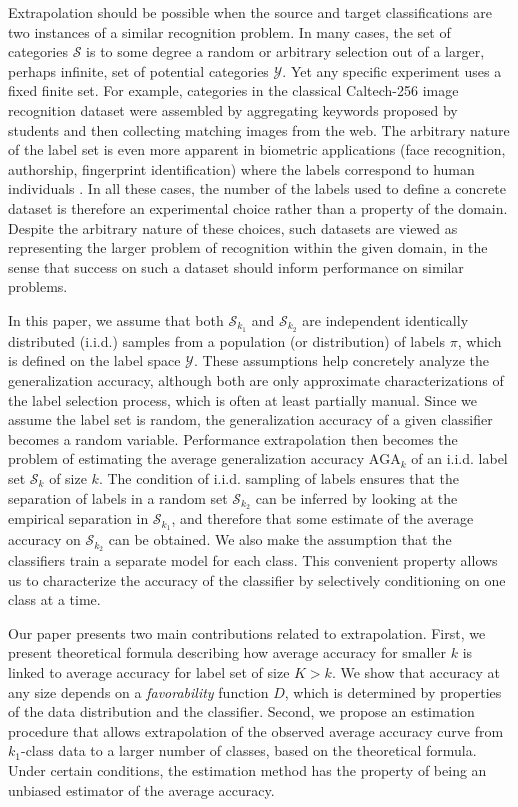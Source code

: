 \documentclass[twoside,11pt]{article}
\begin{document}
Extrapolation should be possible when the source and target
classifications are two instances of a similar recognition problem.  In
many cases, the set of categories $\mathcal{S}$ is to some degree a
random or arbitrary selection out of a larger, perhaps infinite, set
of potential categories $\mathcal{Y}$. Yet any specific experiment
uses a fixed finite set.  For example, categories in the classical
Caltech-256 image recognition dataset \citep{griffin2007caltech} were
assembled by aggregating keywords proposed by students and then
collecting matching images from the web.  The arbitrary nature of the
label set is even more apparent in biometric applications (face
recognition, authorship, fingerprint identification) where the labels
correspond to human individuals \citep{togneri2011overview,
  stamatatos2014overview}.  In all these cases, the number of the
labels used to define a concrete dataset is therefore an experimental
choice rather than a property of the domain.  Despite the arbitrary
nature of these choices, such datasets are viewed as representing the
larger problem of recognition within the given domain, in the sense
that success on such a dataset should inform performance on similar
problems.

In this paper, we assume that both $\mathcal{S}_{k_1}$ and
$\mathcal{S}_{k_2}$ are independent identically distributed (i.i.d.)
samples from a population (or distribution) of labels $ \pi$, which is
defined on the label space $\mathcal{Y}$.  These assumptions help concretely analyze the generalization accuracy, although both are only approximate characterizations of the label selection process, which is often at least partially manual. Since we assume the label set is random, the generalization accuracy of a given classifier becomes a
random variable.  Performance extrapolation then becomes the problem
of estimating the average generalization accuracy $\text{AGA}_k$ of an
i.i.d. label set $\mathcal{S}_k$ of size $k$.  The condition of
i.i.d. sampling of labels ensures that the separation of labels in a
random set $\mathcal{S}_{k_2}$ can be inferred by looking at the
empirical separation in $\mathcal{S}_{k_1}$, and therefore that some
estimate of the average accuracy on $\mathcal{S}_{k_2}$ can be
obtained.  We also make the assumption that the classifiers train a
separate model for each class.  This convenient property allows us to
characterize the accuracy of the classifier by selectively
conditioning on one class at a time.

Our paper presents two main contributions related to extrapolation.  First, we present theoretical formula describing how average accuracy for smaller $k$ is linked to average accuracy for label set of size $K>k$.
We show that accuracy at any size depends on a \emph{favorability} function ${D}$, which is determined by properties of the data distribution and the classifier.  Second, we propose an estimation procedure that allows extrapolation  of the observed average accuracy curve from $k_1$-class data to a larger number of classes, based on the theoretical formula. Under certain conditions, the estimation method  has the property of being an unbiased estimator of the average accuracy.
\end{document}
